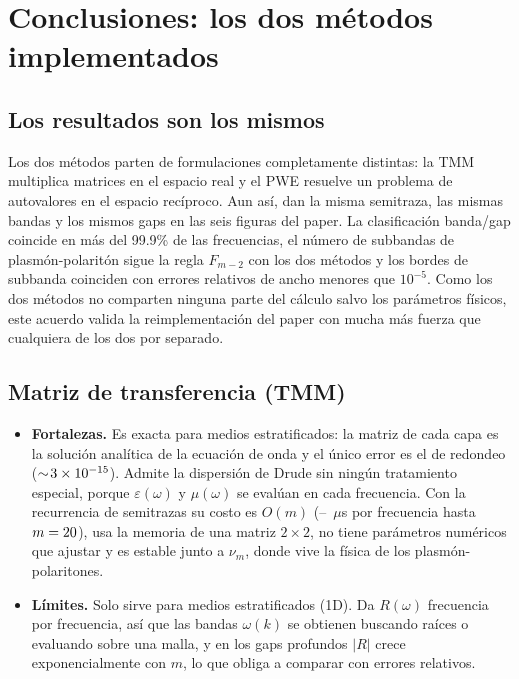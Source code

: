 \documentclass[11pt,a4paper]{article}
\begin{document}
\section{Conclusiones: los dos métodos implementados}
\label{sec:conclusiones}

\subsection*{Los resultados son los mismos}

Los dos métodos parten de formulaciones completamente distintas: la TMM multiplica
matrices en el espacio real y el PWE resuelve un problema de autovalores en el
espacio recíproco. Aun así, dan la misma semitraza, las mismas bandas y los mismos
gaps en las seis figuras del paper. La clasificación banda/gap coincide en más del
99.9\% de las frecuencias, el número de subbandas de plasmón-polaritón sigue la
regla $F_{m-2}$ con los dos métodos y los bordes de subbanda coinciden con errores
relativos de ancho menores que $10^{-5}$. Como los dos métodos no comparten ninguna
parte del cálculo salvo los parámetros físicos, este acuerdo valida la
reimplementación del paper con mucha más fuerza que cualquiera de los dos por
separado.

\subsection*{Matriz de transferencia (TMM)}

\begin{itemize}
\item \textbf{Fortalezas.} Es exacta para medios estratificados: la matriz de cada
capa es la solución analítica de la ecuación de onda y el único error es el de
redondeo ($\sim\!3\times10^{-15}$). Admite la dispersión de Drude sin ningún
tratamiento especial, porque $\varepsilon(\omega)$ y $\mu(\omega)$ se evalúan en
cada frecuencia. Con la recurrencia de semitrazas su costo es $O(m)$
(\EffTmmRecMin--\EffTmmScalar~$\mu$s por frecuencia hasta
$m=20$), usa la memoria de una matriz $2\times2$, no tiene parámetros
numéricos que ajustar y es estable junto a $\nu_m$, donde vive la física de los
plasmón-polaritones.
\item \textbf{Límites.} Solo sirve para medios estratificados (1D). Da $R(\omega)$
frecuencia por frecuencia, así que las bandas $\omega(k)$ se obtienen buscando
raíces o evaluando sobre una malla, y en los gaps profundos $|R|$ crece
exponencialmente con $m$, lo que obliga a comparar con errores relativos.
\end{itemize}
\end{document}
